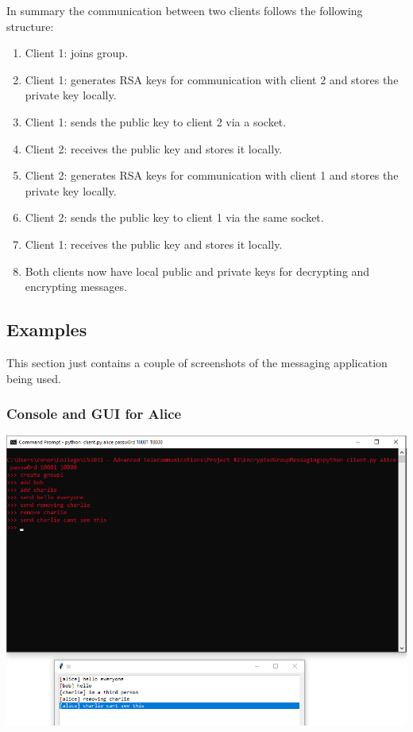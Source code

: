 \documentclass[12pt]{article}
\begin{document}
\indent In summary the communication between two clients follows the following structure:

\begin{enumerate}
  \item Client 1: joins group.
  \item Client 1: generates RSA keys for communication with client 2 and stores the private key locally.
  \item Client 1: sends the public key to client 2 via a socket.
  \item Client 2: receives the public key and stores it locally.
  \item Client 2: generates RSA keys for communication with client 1 and stores the private key locally.
  \item Client 2: sends the public key to client 1 via the same socket.
  \item Client 1: receives the public key and stores it locally.
  \item Both clients now have local public and private keys for decrypting and encrypting messages.
\end{enumerate}

\subsection{Examples}

\indent This section just contains a couple of screenshots of the messaging application being used.

\subsubsection{Console and GUI for Alice}

\includegraphics[scale=0.8]{alice_both.png}
\end{document}
